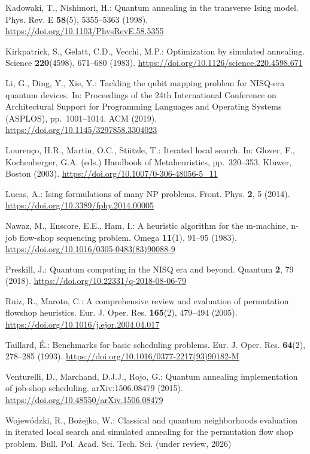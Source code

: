 \documentclass{svproc}
\newif\ifblind
\begin{document}
\begin{thebibliography}{22}
Kadowaki, T., Nishimori, H.: Quantum annealing in the transverse Ising
model. Phys. Rev. E \textbf{58}(5), 5355--5363 (1998).
\url{https://doi.org/10.1103/PhysRevE.58.5355}

Kirkpatrick, S., Gelatt, C.D., Vecchi, M.P.: Optimization by simulated
annealing. Science \textbf{220}(4598), 671--680 (1983).
\url{https://doi.org/10.1126/science.220.4598.671}

Li, G., Ding, Y., Xie, Y.: Tackling the qubit mapping problem for
NISQ-era quantum devices. In: Proceedings of the 24th International
Conference on Architectural Support for Programming Languages and
Operating Systems (ASPLOS), pp.\ 1001--1014. ACM (2019).
\url{https://doi.org/10.1145/3297858.3304023}

Louren\c{c}o, H.R., Martin, O.C., St\"{u}tzle, T.: Iterated local search.
In: Glover, F., Kochenberger, G.A. (eds.) Handbook of Metaheuristics,
pp.\ 320--353. Kluwer, Boston (2003).
\url{https://doi.org/10.1007/0-306-48056-5_11}

Lucas, A.: Ising formulations of many NP problems. Front. Phys.
\textbf{2}, 5 (2014). \url{https://doi.org/10.3389/fphy.2014.00005}

Nawaz, M., Enscore, E.E., Ham, I.: A heuristic algorithm for the
m-machine, n-job flow-shop sequencing problem. Omega \textbf{11}(1),
91--95 (1983). \url{https://doi.org/10.1016/0305-0483(83)90088-9}

Preskill, J.: Quantum computing in the NISQ era and beyond. Quantum
\textbf{2}, 79 (2018). \url{https://doi.org/10.22331/q-2018-08-06-79}

Ruiz, R., Maroto, C.: A comprehensive review and evaluation of
permutation flowshop heuristics. Eur. J. Oper. Res. \textbf{165}(2),
479--494 (2005). \url{https://doi.org/10.1016/j.ejor.2004.04.017}

Taillard, \'{E}.: Benchmarks for basic scheduling problems. Eur. J. Oper.
Res. \textbf{64}(2), 278--285 (1993).
\url{https://doi.org/10.1016/0377-2217(93)90182-M}

Venturelli, D., Marchand, D.J.J., Rojo, G.: Quantum annealing
implementation of job-shop scheduling. arXiv:1506.08479 (2015).
\url{https://doi.org/10.48550/arXiv.1506.08479}

\ifblind
[Authors omitted for blind review]: Classical and quantum neighborhoods
evaluation in iterated local search and simulated annealing for the
permutation flow shop problem. Bull. Pol. Acad. Sci. Tech. Sci.
(under review, 2026)
\else
Wojew\'{o}dzki, R., Bo\.{z}ejko, W.: Classical and quantum neighborhoods
evaluation in iterated local search and simulated annealing for the
permutation flow shop problem. Bull. Pol. Acad. Sci. Tech. Sci.
(under review, 2026)
\fi


\end{thebibliography}
\end{document}
